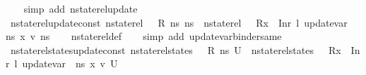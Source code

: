\begin{isabellebody}
\ \ \isamarkupfalse%
\ {\isacharparenleft}{\kern0pt}simp\ add{\isacharcolon}{\kern0pt}\ nstate{\isacharunderscore}{\kern0pt}rel{\isacharunderscore}{\kern0pt}update{\isacharunderscore}{\kern0pt}{}{\isacharparenright}{\kern0pt}%
\endisatagproof
{\isafoldproof}%
%
\isadelimproof
\isanewline
%
\endisadelimproof
\ \ \isanewline
{}\isamarkupfalse%
\ nstate{\isacharunderscore}{\kern0pt}rel{\isacharunderscore}{\kern0pt}update{\isacharunderscore}{\kern0pt}const{\isacharcolon}{\kern0pt}\ {\isachardoublequoteopen}nstate{\isacharunderscore}{\kern0pt}rel\ {\isasymLambda}\ {\isasymLambda}{\isacharprime}{\kern0pt}\ R\ ns{}\ ns{}\ {\isasymLongrightarrow}\ nstate{\isacharunderscore}{\kern0pt}rel\ {\isasymLambda}\ {\isasymLambda}{\isacharprime}{\kern0pt}\ {\isacharparenleft}{\kern0pt}R{\isacharparenleft}{\kern0pt}x\ {\isasymmapsto}\ Inr\ l{\isacharparenright}{\kern0pt}{\isacharparenright}{\kern0pt}\ {\isacharparenleft}{\kern0pt}update{\isacharunderscore}{\kern0pt}var\ {\isasymLambda}\ ns{}\ x\ v{\isacharparenright}{\kern0pt}\ ns{}{\isachardoublequoteclose}\isanewline
%
\isadelimproof
\ \ %
\endisadelimproof
%
\isatagproof
{}\isamarkupfalse%
\ nstate{\isacharunderscore}{\kern0pt}rel{\isacharunderscore}{\kern0pt}def\isanewline
\ \ \isamarkupfalse%
\ {\isacharparenleft}{\kern0pt}simp\ add{\isacharcolon}{\kern0pt}\ update{\isacharunderscore}{\kern0pt}var{\isacharunderscore}{\kern0pt}binder{\isacharunderscore}{\kern0pt}same{\isacharparenright}{\kern0pt}%
\endisatagproof
{\isafoldproof}%
%
\isadelimproof
\isanewline
%
\endisadelimproof
\isanewline
{}\isamarkupfalse%
\ nstate{\isacharunderscore}{\kern0pt}rel{\isacharunderscore}{\kern0pt}states{\isacharunderscore}{\kern0pt}update{\isacharunderscore}{\kern0pt}const{\isacharcolon}{\kern0pt}\ {\isachardoublequoteopen}nstate{\isacharunderscore}{\kern0pt}rel{\isacharunderscore}{\kern0pt}states\ {\isasymLambda}\ {\isasymLambda}{\isacharprime}{\kern0pt}\ R\ ns{}\ U\ {\isasymLongrightarrow}\ nstate{\isacharunderscore}{\kern0pt}rel{\isacharunderscore}{\kern0pt}states\ {\isasymLambda}\ {\isasymLambda}{\isacharprime}{\kern0pt}\ {\isacharparenleft}{\kern0pt}R{\isacharparenleft}{\kern0pt}x\ {\isasymmapsto}\ Inr\ l{\isacharparenright}{\kern0pt}{\isacharparenright}{\kern0pt}\ {\isacharparenleft}{\kern0pt}update{\isacharunderscore}{\kern0pt}var\ {\isasymLambda}\ ns{}\ x\ v{\isacharparenright}{\kern0pt}\ U{\isachardoublequoteclose}\isanewline
%
\isadelimproof
\ \ %
\endisadelimproof

\end{isabellebody}
